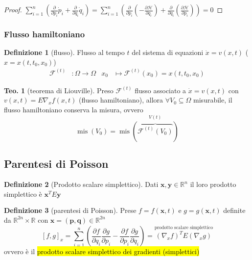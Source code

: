 \documentclass[a4paper,10pt]{article}
\theoremstyle{definition}
\DeclareMathOperator*{\mis}{mis}
\newcommand{\bv}{\boldsymbol} %
\newcommand{\re}{\mathbb{R}} %
\theoremstyle{indentdefinition}
\newtheorem{defn}{Definizione}[section]
\theoremstyle{indenttheorem}
\newtheorem{thm}{Teo.}
\theoremstyle{myremark}
\theoremstyle{indentgeneral}
\begin{document}
\begin{proof}
$\sum_{i=1}^{n}\left(\frac{\partial}{\partial p_{i}}\dot{p}_{i}+\frac{\partial}{\partial q_{i}}\dot{q}_{i}\right)=\sum_{i=1}^{n}\left(\frac{\partial}{\partial p_{i}}\left(-\frac{\partial\mathcal{H}}{\partial q_{i}}\right)+\frac{\partial}{\partial q_{i}}\left(\frac{\partial\mathcal{H}}{\partial p_{i}}\right)\right)=0$
\end{proof}

\subsubsection{Flusso hamiltoniano}
\begin{defn}[flusso]
\label{def:flusso}Flusso al tempo $t$ del sistema di equazioni
$\dot{x}=v\left(x,t\right)$ ($x=x\left(t,t_{0},x_{0}\right)$)
\begin{align*}
\mathcal{F}^{\left(t\right)} & \colon\Omega\longrightarrow\Omega & x_{0} & \longmapsto\mathcal{F}^{\left(t\right)}\left(x_{0}\right)=x\left(t,t_{0},x_{0}\right)
\end{align*}
\end{defn}

\begin{thm}[teorema di Liouville]
\label{thm:teorema-Liouville}Preso $\mathcal{F}^{\left(t\right)}$
flusso associato a $\dot{x}=v\left(x,t\right)$ con $v\left(x,t\right)=E\nabla_{x}f\left(x,t\right)$
(flusso hamiltoniano), allora $\forall V_{0}\subseteq\Omega$ misurabile,
il flusso hamiltoniano conserva la misura, ovvero
\[
\mis\left(V_{0}\right)=\mis\overset{V\left(t\right)}{\left(\overbrace{\mathcal{F}^{\left(t\right)}\left(V_{0}\right)}\right)}
\]
\end{thm}


\subsection{Parentesi di Poisson}
\begin{defn}[Prodotto scalare simplettico]
    Dati $\bv{x},\bv{y}\in\re^n$ il loro prodotto simplettico è $\bv{x}^TE\bv{y}$
\end{defn}
\begin{defn}[parentesi di Poisson]
\label{def:parentesi-Poisson}Prese $f=f\left(\bv{x},t\right)$ e $g=g\left(\bv{x},t\right)$
definite da $\mathbb{R}^{2n}\times\mathbb{R}$ con $\bv{x}=(\bv{p},\bv{q})\in\re^{2n}$
\[
\left[f,g\right]_{x}=\sum_{i=1}^{n}\left(\frac{\partial f}{\partial q_{i}}\frac{\partial g}{\partial p_{i}}-\frac{\partial f}{\partial p_{i}}\frac{\partial g}{\partial q_{i}}\right)=\overset{\text{prodotto scalare simplettico}}{\boxed{\left(\nabla_{x}f\right)^{T}E\left(\nabla_{x}g\right)}}
\]
ovvero è il \hl{prodotto scalare simplettico dei gradienti (simplettici)}
\end{defn}
\end{document}
